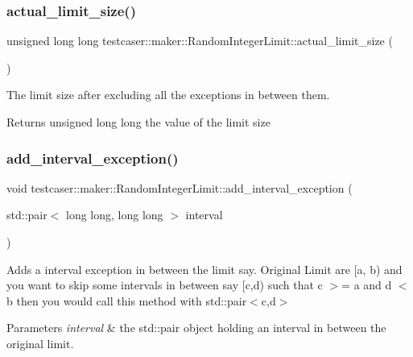 \subsubsection{\texorpdfstring{actual\_limit\_size()}{actual\_limit\_size()}}
{\footnotesize\ttfamily unsigned long long testcaser\+::maker\+::\+Random\+Integer\+Limit\+::actual\+\_\+limit\+\_\+size (\begin{DoxyParamCaption}{ }\end{DoxyParamCaption})\hspace{0.3cm}{\ttfamily [inline]}}



The limit size after excluding all the exceptions in between them. 

\begin{DoxyReturn}{Returns}
unsigned long long the value of the limit size 
\end{DoxyReturn}
\mbox{\label{classtestcaser_1_1maker_1_1RandomIntegerLimit_aab21ea4c9643021d1993da96408a9d6d}} 
\subsubsection{\texorpdfstring{add\_interval\_exception()}{add\_interval\_exception()}}
{\footnotesize\ttfamily void testcaser\+::maker\+::\+Random\+Integer\+Limit\+::add\+\_\+interval\+\_\+exception (\begin{DoxyParamCaption}\item[{std\+::pair$<$ long long, long long $>$}]{interval }\end{DoxyParamCaption})\hspace{0.3cm}{\ttfamily [inline]}}



Adds a interval exception in between the limit say. Original Limit are \mbox{[}a, b) and you want to skip some intervals in between say \mbox{[}c,d) such that c $>$= a and d $<$ b then you would call this method with std\+::pair$<$c,d$>$ 


\begin{DoxyParams}{Parameters}
{\em interval} & the std\+::pair object holding an interval in between the original limit. \\
\hline
\end{DoxyParams}
\mbox{\label{classtestcaser_1_1maker_1_1RandomIntegerLimit_a3015e3b8e3c490e9acad46faf8c2bc96}} 
